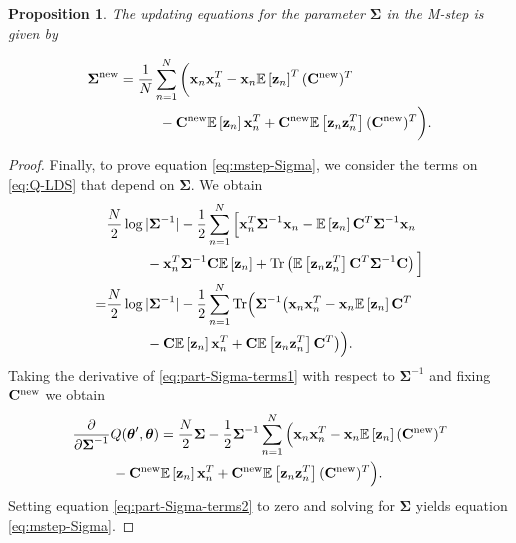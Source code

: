 \documentclass[11pt]{article}
\numberwithin{equation}{section}
\newcommand{\expectation}[1]{\mathbb{E}\left[#1\right]}
\newcommand{\Tr}[1]{\text{Tr}\left(#1\right)}
\newcommand{\x}{{\bf x}}
\newcommand{\z}{{\bf z}}
\newtheorem{proposition}{Proposition}[section]
\begin{document}
\begin{proposition}
	The updating equations for the parameter $\boldsymbol{\Sigma}$ in the M-step is given by
	
	\begin{align}
		\boldsymbol{\Sigma}^{\text{\normalfont new}} &= \frac{1}{N}\sum_{n=1}^N\bigg(\x_n\x_n^T - \x_n \expectation{\z_n}^T ({\bf C}^{\text{\normalfont new}})^T \nonumber\\
		&\hspace{1cm} - {\bf C}^{\text{\normalfont new}}\expectation{\z_n}\x_n^T + {\bf C}^{\text{\normalfont new}} \expectation{\z_n \z_n^T}({\bf C}^{\text{\normalfont new}})^T \bigg). \label{eq:mstep-Sigma}
	\end{align}
\end{proposition}



\begin{proof}
	Finally, to prove equation \eqref{eq:mstep-Sigma}, we consider the terms on \eqref{eq:Q-LDS} that depend on $\boldsymbol{\Sigma}$. We obtain
	\begin{align}
		 & \frac{N}{2}\log\vert\boldsymbol\Sigma^{-1}\vert -\frac{1}{2}\sum_{n=1}^N \Big[ \x_n^T \boldsymbol{\Sigma}^{-1}\x_n - \expectation{\z_n}{\bf C}^T\boldsymbol{\Sigma}^{-1}\x_n \nonumber\\
		 &\hspace{1cm}- \x_n^T \boldsymbol{\Sigma}^{-1}{\bf C}\expectation{\z_n} + \Tr{\expectation{\z_n\z_n^T}{\bf C}^T\boldsymbol{\Sigma}^{-1}{\bf C}} \Big]\\
		=& \frac{N}{2}\log\vert\boldsymbol\Sigma^{-1}\vert -\frac{1}{2}\sum_{n=1}^N\text{Tr}\Big(\boldsymbol\Sigma^{-1} \big(\x_n\x_n^T - \x_n\expectation{\z_n}{\bf C}^T \nonumber\\
		&\hspace{1cm}- {\bf C}\expectation{\z_n}\x_n^T + {\bf C}\expectation{\z_n\z_n^T}{\bf C}^T\big)\Big). \label{eq:part-Sigma-terms1}
	\end{align}	
	Taking the derivative of \eqref{eq:part-Sigma-terms1} with respect to $\boldsymbol{\Sigma}^{-1}$ and fixing ${\bf C}^{\text{new}}$ we obtain
	\begin{align}
		&\frac{\partial}{\partial \boldsymbol{\Sigma}^{-1}} Q(\boldsymbol\theta', \boldsymbol\theta) = \frac{N}{2}\boldsymbol{\Sigma} - \frac{1}{2}\boldsymbol\Sigma^{-1}\sum_{n=1}^N\Big( \x_n\x_n^T - \x_n\expectation{\z_n}({\bf C}^{\text{new}})^T \nonumber\\
			&\hspace{1cm}- {\bf C}^{\text{new}}\expectation{\z_n}\x_n^T + {\bf C}^{\text{new}}\expectation{\z_n\z_n^T}({\bf C}^{\text{new}})^T \Big) \label{eq:part-Sigma-terms2}.
	\end{align}
	Setting equation \eqref{eq:part-Sigma-terms2} to zero and solving for $\boldsymbol{\Sigma}$ yields equation \eqref{eq:mstep-Sigma}.
\end{proof}
\end{document}
